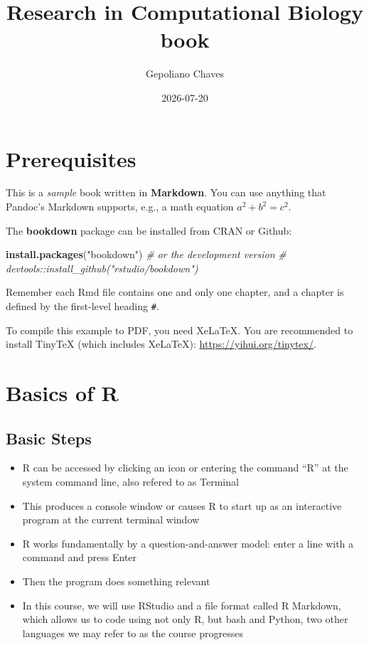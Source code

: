 \documentclass[
]{book}
\title{Research in Computational Biology book}
\author{Gepoliano Chaves}
\date{2026-07-20}
\newenvironment{Shaded}{\begin{snugshade}}{\end{snugshade}}
\newcommand{\CommentTok}[1]{\textcolor[rgb]{0.56,0.35,0.01}{\textit{#1}}}
\newcommand{\FunctionTok}[1]{\textcolor[rgb]{0.13,0.29,0.53}{\textbf{#1}}}
\newcommand{\NormalTok}[1]{#1}
\newcommand{\StringTok}[1]{\textcolor[rgb]{0.31,0.60,0.02}{#1}}
\begin{document}
\maketitle

{
\setcounter{tocdepth}{1}
\tableofcontents
}
\chapter{Prerequisites}\label{prerequisites}

This is a \emph{sample} book written in \textbf{Markdown}. You can use anything that Pandoc's Markdown supports, e.g., a math equation \(a^2 + b^2 = c^2\).

The \textbf{bookdown} package can be installed from CRAN or Github:

\begin{Shaded}
\begin{Highlighting}[]
\FunctionTok{install.packages}\NormalTok{(}\StringTok{"bookdown"}\NormalTok{)}
\CommentTok{\# or the development version}
\CommentTok{\# devtools::install\_github("rstudio/bookdown")}
\end{Highlighting}
\end{Shaded}

Remember each Rmd file contains one and only one chapter, and a chapter is defined by the first-level heading \texttt{\#}.

To compile this example to PDF, you need XeLaTeX. You are recommended to install TinyTeX (which includes XeLaTeX): \url{https://yihui.org/tinytex/}.

\chapter{Basics of R}\label{basics-of-r}

\section{Basic Steps}\label{basic-steps}

\begin{itemize}
\item
  R can be accessed by clicking an icon or entering the command ``R'' at the system command line, also refered to as Terminal
\item
  This produces a console window or causes R to start up as an interactive program at the current terminal window
\item
  R works fundamentally by a question-and-answer model: enter a line with a command and press Enter
\item
  Then the program does something relevant
\item
  In this course, we will use RStudio and a file format called R Markdown, which allows us to code using not only R, but bash and Python, two other languages we may refer to as the course progresses
\end{itemize}
\end{document}
